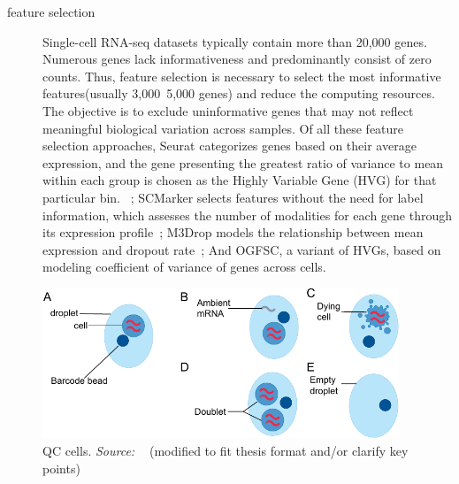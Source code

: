 \begin{description}
	\item[feature selection] Single-cell RNA-seq datasets typically contain more than 20,000 genes. Numerous genes lack informativeness and predominantly consist of zero counts. Thus, feature selection is necessary to select the most informative features(usually 3,000~5,000 genes) and reduce the computing resources. The objective is to exclude uninformative genes that may not reflect meaningful biological variation across samples. Of all these feature selection approaches, Seurat categorizes genes based on their average expression, and the gene presenting the greatest ratio of variance to mean within each group is chosen as the Highly Variable Gene (HVG) for that particular bin. ~\citep{stuart2019seurat3}; SCMarker selects features without the need for label information, which assesses the number of modalities for each gene through its expression profile~\citep{wang2019scmarker}; M3Drop models the relationship between mean expression and dropout rate~\citep{andrews2019m3drop}; And OGFSC, a variant of HVGs, based on modeling coefficient of variance of genes across cells. ~\citep{hao2019OGFSC}
\end{description}

\begin{figure}[!ht]
	\centering
	\includegraphics[width=0.95\textwidth]{QC_cells/fig}
	\vspace{0.1cm}
	\caption[QC\_cells.]{QC cells. \emph{Source: ~\cite{heumos2023best}} (modified to fit thesis format and/or clarify key points)}
	\label{fig:QCcells}
\end{figure}
